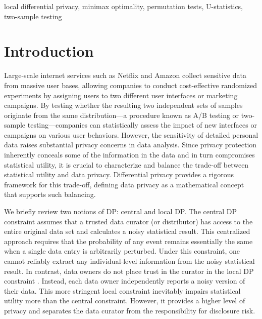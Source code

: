 \documentclass[twoside,11pt]{article}
\begin{document}
\begin{keywords}
 local differential privacy, minimax optimality, permutation tests, U-statistics, two-sample testing
\end{keywords}




\setcounter{tocdepth}{2}

\section{Introduction}\label{section_intro}
Large-scale internet services such as Netflix and Amazon collect sensitive data from massive user bases, allowing companies to conduct cost-effective randomized experiments by assigning users to two different user interfaces or marketing campaigns. By testing whether the resulting two independent sets of samples originate from the same distribution{---}a procedure known as A/B testing or two-sample testing{---}companies can statistically assess the impact of new interfaces or campaigns on various user behaviors. However, the sensitivity of detailed personal data raises substantial privacy concerns in data analysis. Since privacy protection inherently conceals some of the information in the data and in turn compromises statistical utility, it is crucial to characterize and balance the trade-off between statistical utility and data privacy. Differential privacy \citep[DP;][]{CynthiaDwork2006CalibratingAnalysis} provides a rigorous framework for this trade-off, defining data privacy as a mathematical concept that supports such balancing.

We briefly review two notions of DP: central and local DP.
The central DP constraint assumes that a trusted data curator (or distributor) has access to the entire original data set and calculates a noisy statistical result. This centralized approach requires that the probability of any event remains essentially the same when a single data entry is arbitrarily perturbed.
Under this constraint, one cannot reliably extract any individual-level information from the noisy statistical result. In contrast, data owners do not place trust in the curator in the local DP constraint  \citep[LDP;][]{Kasiviswanathan2008WhatPrivately}. Instead, each data owner independently reports a noisy version of their data. This more stringent local constraint inevitably impairs statistical utility more than the central constraint. However, it provides a higher level of privacy and separates the data curator from the responsibility for disclosure risk.
\end{document}
